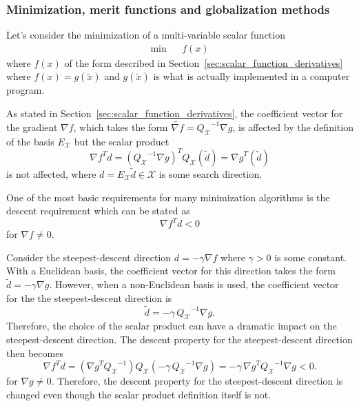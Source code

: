 \subsubsection{Minimization, merit functions and globalization methods}

Let's consider the minimization of a multi-variable scalar function
%
\begin{eqnarray}
\mbox{min} & & f(x)
\end{eqnarray}
%
where $f(x)$ of the form described in
Section~\ref{sec:scalar_function_derivatives} where $f(x) = g(\tilde{x})$ and
$g(\tilde{x})$ is what is actually implemented in a computer program.

As stated in Section~\ref{sec:scalar_function_derivatives}, the coefficient
vector for the gradient $\nabla f$, which takes the form $\tilde{\nabla f} =
{Q_{\mathcal{X}}}^{-1} {}\nabla g$, is affected by the definition of the basis
$E_{\mathcal{X}}$ but the scalar product
%
\begin{equation}
{\nabla f}^T d
= ({Q_{\mathcal{X}}}^{-1} {}\nabla g)^T Q_{\mathcal{X}} (\tilde{d})
 = {\nabla g}^T (\tilde{d})
\label{eqn:descent_inner_prod}
\end{equation}
%
is not affected, where $d=E_{\mathcal{X}}\tilde{d}\in\mathcal{X}$ is some
search direction.

One of the most basic requirements for many minimization algorithms is the
descent requirement which can be stated as
%
\begin{equation}
{\nabla f}^T d < 0
\label{eqn:descent_condition}
\end{equation}
%
for $\nabla f {}\ne 0$.

Consider the steepest-descent direction $d = -{}\gamma\nabla f$ where $\gamma
>0$ is some constant.  With a Euclidean basis, the coefficient vector for this
direction takes the form $\tilde{d} = -{}\gamma\nabla g$.  However, when a
non-Euclidean basis is used, the coefficient vector for the the
steepest-descent direction is
%
\[
\tilde{d} = - \gamma \, {Q_{\mathcal{X}}}^{-1} \nabla g. 
\]
%
Therefore, the choice of the scalar product can have a dramatic impact on the
steepest-descent direction.  The descent property for the steepest-descent direction then
becomes
%
\[
{\nabla f}^T d
= ( {\nabla g}^T {Q_{\mathcal{X}}}^{-1}) Q_{\mathcal{X}} (-\gamma\,{Q_{\mathcal{X}}}^{-1} \nabla g)
= -\gamma\,{\nabla g}^T {Q_{\mathcal{X}}}^{-1} \nabla g < 0.
\]
%
for $\nabla g {}\ne 0$.  Therefore, the descent property for the
steepest-descent direction is changed even though the scalar product
definition itself is not.

